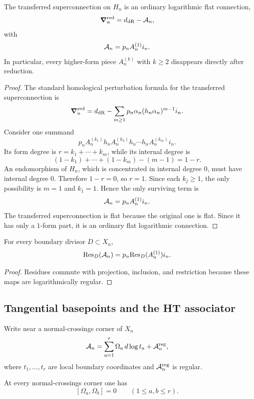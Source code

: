 \begin{theorem}\label{thm:one-form-rigidity}
The transferred superconnection on $H_n$ is an ordinary logarithmic flat connection,
\[
 \boldsymbol{\nabla}_n^{\mathrm{red}} = d_{\mathrm{dR}}-\mathcal A_n,
\]
with
\[
 \mathcal A_n = p_nA_n^{(1)}i_n.
\]
In particular, every higher-form piece $A_n^{(k)}$ with $k\ge 2$ disappears directly after reduction.
\end{theorem}

\begin{proof}
The standard homological perturbation formula for the transferred superconnection is
\[
 \boldsymbol{\nabla}_n^{\mathrm{red}}
 =
 d_{\mathrm{dR}}-\sum_{m\ge 1} p_n\alpha_n(h_n\alpha_n)^{m-1}i_n.
\]
Consider one summand
\[
 p_n A_n^{(k_1)} h_n A_n^{(k_2)} h_n \cdots h_n A_n^{(k_m)} i_n.
\]
Its form degree is $r=k_1+\cdots+k_m$, while its internal degree is
\[
 (1-k_1)+\cdots+(1-k_m)-(m-1)=1-r.
\]
An endomorphism of $H_n$, which is concentrated in internal degree $0$, must have internal degree $0$. Therefore $1-r=0$, so $r=1$. Since each $k_j\ge 1$, the only possibility is $m=1$ and $k_1=1$. Hence the only surviving term is
\[
 \mathcal A_n = p_nA_n^{(1)}i_n.
\]
The transferred superconnection is flat because the original one is flat. Since it has only a $1$-form part, it is an ordinary flat logarithmic connection.
\end{proof}

\begin{corollary}\label{cor:reduced-residues}
For every boundary divisor $D\subset X_n$,
\[
 \mathrm{Res}_D(\mathcal A_n)=p_n\mathrm{Res}_D(A_n^{(1)})i_n.
\]
\end{corollary}

\begin{proof}
Residues commute with projection, inclusion, and restriction because these maps are logarithmically regular.
\end{proof}

\subsection{Tangential basepoints and the HT associator}
Write near a normal-crossings corner of $X_n$
\[
 \mathcal A_n = \sum_{a=1}^r \Omega_a\,d\log t_a + \mathcal A_n^{\mathrm{reg}},
\]
where $t_1,\dots,t_r$ are local boundary coordinates and $\mathcal A_n^{\mathrm{reg}}$ is regular.

\begin{lemma}\label{lem:commuting-residues}
At every normal-crossings corner one has
\[
 [\Omega_a,\Omega_b]=0\qquad (1\le a,b\le r).
\]
\end{lemma}

